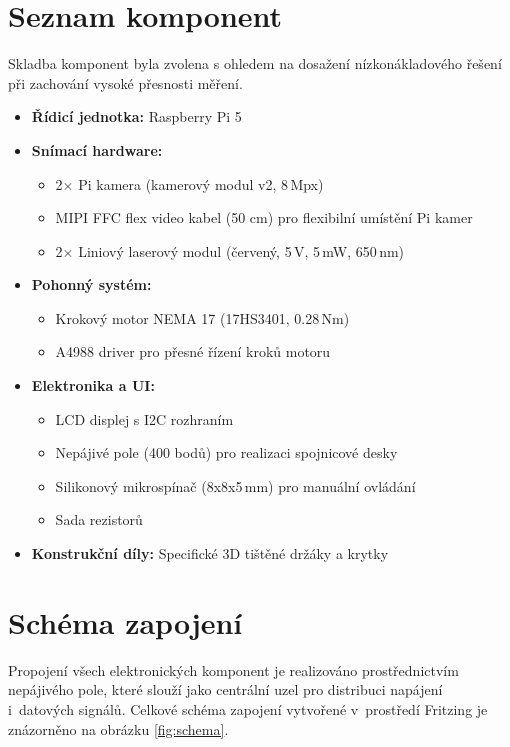 \documentclass[12pt,a4paper]{report}
\begin{document}
\section{Seznam komponent}
Skladba komponent byla zvolena s ohledem na dosažení nízkonákladového řešení při zachování vysoké přesnosti měření.

\begin{itemize}
    \item \textbf{Řídicí jednotka:} Raspberry Pi 5
    \item \textbf{Snímací hardware:}
    \begin{itemize}
        \item 2$\times$ Pi kamera (kamerový modul v2, 8\,Mpx)
        \item MIPI FFC flex video kabel (50 cm) pro flexibilní umístění Pi kamer
        \item 2$\times$ Liniový laserový modul (červený, 5\,V, 5\,mW, 650\,nm)
    \end{itemize}
    \item \textbf{Pohonný systém:}
    \begin{itemize}
        \item Krokový motor NEMA 17 (17HS3401, 0.28\,Nm)
        \item A4988 driver pro přesné řízení kroků motoru
    \end{itemize}
    \item \textbf{Elektronika a UI:}
    \begin{itemize}
        \item LCD displej s I2C rozhraním
        \item Nepájivé pole (400 bodů) pro realizaci spojnicové desky
        \item Silikonový mikrospínač (8x8x5\,mm) pro manuální ovládání
        \item Sada rezistorů
    \end{itemize}
    \item \textbf{Konstrukční díly:} Specifické 3D tištěné držáky a krytky
\end{itemize}
\clearpage
\section{Schéma zapojení}
Propojení všech elektronických komponent je realizováno prostřednictvím nepájivého pole, které slouží jako centrální uzel pro distribuci napájení i~datových signálů. Celkové schéma zapojení vytvořené v~prostředí Fritzing je znázorněno na obrázku \ref{fig:schema}.
\end{document}
